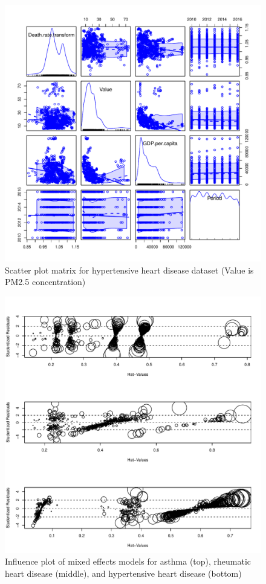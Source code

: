 \documentclass[12pt, letterpaper, twoside]{article}
\begin{document}
\begin{figure}[t]
\includegraphics[scale=0.5]{scatterplotmatrix.hyper.pdf}
\centering
\caption{Scatter plot matrix for hypertensive heart disease dataset (Value is PM2.5 concentration)}
\label{fig:Figure 4}
    \vspace{1cm}
\end{figure}

\begin{figure}[t]
\includegraphics[scale=0.5]{influenceplot.pdf}
\centering
\caption{Influence plot of mixed effects models for asthma (top), rheumatic heart
disease (middle), and hypertensive heart disease (bottom)}
\label{fig:Figure 5}
    \vspace{1cm}
\end{figure}
\end{document}
